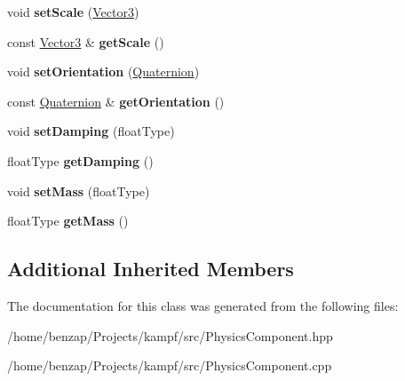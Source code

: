 \begin{DoxyCompactItemize}
\item 
\hypertarget{classPhysicsComponent_a0b2e26d62db060ad02f800081492bfe2}{void {\bfseries set\-Scale} (\hyperlink{classVector3}{Vector3})}\label{classPhysicsComponent_a0b2e26d62db060ad02f800081492bfe2}

\item 
\hypertarget{classPhysicsComponent_a5fed9267e2a30465b7f7154c773a2590}{const \hyperlink{classVector3}{Vector3} \& {\bfseries get\-Scale} ()}\label{classPhysicsComponent_a5fed9267e2a30465b7f7154c773a2590}

\item 
\hypertarget{classPhysicsComponent_accd0b60e0b4e7b4fdedc658e5d37b9be}{void {\bfseries set\-Orientation} (\hyperlink{classQuaternion}{Quaternion})}\label{classPhysicsComponent_accd0b60e0b4e7b4fdedc658e5d37b9be}

\item 
\hypertarget{classPhysicsComponent_a54e8f691be9b6656ee826e3fe51539f7}{const \hyperlink{classQuaternion}{Quaternion} \& {\bfseries get\-Orientation} ()}\label{classPhysicsComponent_a54e8f691be9b6656ee826e3fe51539f7}

\item 
\hypertarget{classPhysicsComponent_ac42586c77f674ba62c3fedfea00a5462}{void {\bfseries set\-Damping} (float\-Type)}\label{classPhysicsComponent_ac42586c77f674ba62c3fedfea00a5462}

\item 
\hypertarget{classPhysicsComponent_ac0d2612e7f0a7cebae02f9bec1d5d4ff}{float\-Type {\bfseries get\-Damping} ()}\label{classPhysicsComponent_ac0d2612e7f0a7cebae02f9bec1d5d4ff}

\item 
\hypertarget{classPhysicsComponent_a5c48a260f024c31c0247f28bd447966f}{void {\bfseries set\-Mass} (float\-Type)}\label{classPhysicsComponent_a5c48a260f024c31c0247f28bd447966f}

\item 
\hypertarget{classPhysicsComponent_a98ec9e46321564250d94faddcd8bec10}{float\-Type {\bfseries get\-Mass} ()}\label{classPhysicsComponent_a98ec9e46321564250d94faddcd8bec10}

\end{DoxyCompactItemize}
\subsection*{Additional Inherited Members}


The documentation for this class was generated from the following files\-:\begin{DoxyCompactItemize}
\item 
/home/benzap/\-Projects/kampf/src/Physics\-Component.\-hpp\item 
/home/benzap/\-Projects/kampf/src/Physics\-Component.\-cpp\end{DoxyCompactItemize}
